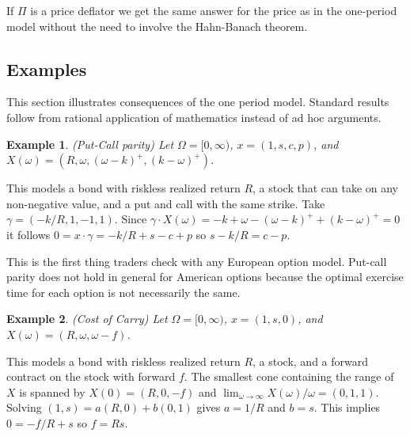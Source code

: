 \documentclass[fleqn]{amsart}
\newtheorem{example}{Example}
\begin{document}
If \(\Pi\) is a price deflator we get the same answer
for the price as in the one-period model without the need
to involve the Hahn-Banach theorem.

\subsection{Examples}
This section illustrates consequences of the one period model.
Standard results follow from rational application of mathematics instead
of ad hoc arguments.

\begin{example}{(Put-Call parity)}
Let \(\Omega = [0,\infty)\), \(x = (1, s, c, p)\), and 
\(X(\omega) = (R, \omega, (\omega - k)^+, (k - \omega)^+)\). 
\end{example}

This models a bond with riskless realized return \(R\), a stock that
can take on any non-negative value, and a put and call with the same strike.
Take \(\gamma = (-k/R, 1, -1, 1)\). Since
\(\gamma\cdot X(\omega) = -k + \omega - (\omega - k)^+ + (k - \omega)^+ = 0\)
it follows \(0 = x\cdot \gamma = -k/R + s - c + p\) so
\(s - k/R = c - p\). 

This is the first thing traders check with any European option model.
Put-call parity does not hold in general for American options because
the optimal exercise time for each option is not necessarily the same.

\begin{example}{(Cost of Carry)}
Let $\Omega = [0,\infty)$, $x = (1, s, 0)$, 
and $X(\omega) = (R, \omega, \omega - f)$.
\end{example}
This models a bond with riskless realized
return $R$, a stock, and a forward contract on the stock with forward $f$.
The smallest cone containing the range of $X$ is spanned
by $X(0) = (R, 0, -f)$ and $\lim_{\omega\to\infty}X(\omega)/\omega = (0, 1, 1)$.
Solving $(1, s) = a(R, 0) + b(0, 1)$ gives $a = 1/R$ and $b = s$.
This implies $0 = -f/R + s$ so $f = Rs$.
\end{document}

